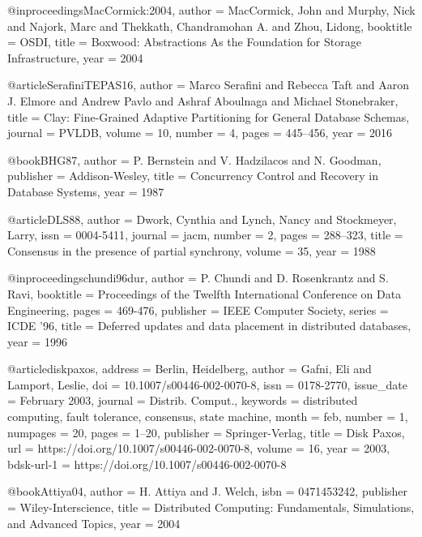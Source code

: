 @inproceedings{MacCormick:2004,
  author    = {MacCormick, John and Murphy, Nick and Najork, Marc and Thekkath, Chandramohan A. and Zhou, Lidong},
  booktitle = {OSDI},
  title     = {Boxwood: Abstractions As the Foundation for Storage Infrastructure},
  year      = {2004}
}

@article{SerafiniTEPAS16,
  author  = {Marco Serafini and
               Rebecca Taft and
               Aaron J. Elmore and
               Andrew Pavlo and
               Ashraf Aboulnaga and
               Michael Stonebraker},
  title   = {Clay: Fine-Grained Adaptive Partitioning for General Database Schemas},
  journal = {{PVLDB}},
  volume  = {10},
  number  = {4},
  pages   = {445--456},
  year    = {2016}
}

@book{BHG87,
  author    = {P. Bernstein and V. Hadzilacos and N. Goodman},
  publisher = {Addison-Wesley},
  title     = {Concurrency Control and Recovery in Database Systems},
  year      = {1987}
}

@article{DLS88,
  author  = {Dwork, Cynthia and Lynch, Nancy and Stockmeyer, Larry},
  issn    = {0004-5411},
  journal = jacm,
  number  = {2},
  pages   = {288--323},
  title   = {Consensus in the presence of partial synchrony},
  volume  = {35},
  year    = {1988}
}

@inproceedings{chundi96dur,
  author    = {P. Chundi and D. Rosenkrantz and S. Ravi},
  booktitle = {Proceedings of the Twelfth International Conference on Data Engineering},
  pages     = {469-476},
  publisher = {{IEEE} Computer Society},
  series    = {ICDE '96},
  title     = {Deferred updates and data placement in distributed databases},
  year      = {1996}
}

@article{diskpaxos,
  address    = {Berlin, Heidelberg},
  author     = {Gafni, Eli and Lamport, Leslie},
  doi        = {10.1007/s00446-002-0070-8},
  issn       = {0178-2770},
  issue_date = {February 2003},
  journal    = {Distrib. Comput.},
  keywords   = {distributed computing, fault tolerance, consensus, state machine},
  month      = feb,
  number     = {1},
  numpages   = {20},
  pages      = {1--20},
  publisher  = {Springer-Verlag},
  title      = {Disk Paxos},
  url        = {https://doi.org/10.1007/s00446-002-0070-8},
  volume     = {16},
  year       = {2003},
  bdsk-url-1 = {https://doi.org/10.1007/s00446-002-0070-8}
}

@book{Attiya04,
  author    = {H. Attiya and J. Welch},
  isbn      = {0471453242},
  publisher = {Wiley-Interscience},
  title     = {Distributed Computing: Fundamentals, Simulations, and Advanced Topics},
  year      = {2004}
}

